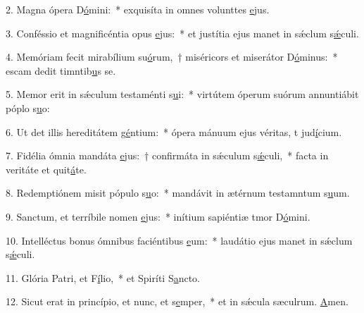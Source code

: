 2. Magna ópera D\uline{ó}mini:~* exquisíta in omnes volunttes \uline{e}jus.\par 
3. Conféssio et magnificéntia opus \uline{e}jus:~* et justítia ejus manet in sǽclum s\uline{ǽ}culi.\par 
4. Memóriam fecit mirabílium su\uline{ó}rum,~† miséricors et miserátor D\uline{ó}minus:~* escam dedit timntib\uline{u}s se.\par 
5. Memor erit in sǽculum testaménti s\uline{u}i:~* virtútem óperum suórum annuntiábit póplo s\uline{u}o:\par 
6. Ut det illis hereditátem g\uline{é}ntium:~* ópera mánuum ejus véritas, t jud\uline{í}cium.\par 
7. Fidélia ómnia mandáta \uline{e}jus:~† confirmáta in sǽculum s\uline{ǽ}culi,~* facta in veritáte et quit\uline{á}te.\par 
8. Redemptiónem misit pópulo s\uline{u}o:~* mandávit in ætérnum testamntum s\uline{u}um.\par 
9. Sanctum, et terríbile nomen \uline{e}jus:~* inítium sapiéntiæ tmor D\uline{ó}mini.\par 
10. Intelléctus bonus ómnibus faciéntibus \uline{e}um:~* laudátio ejus manet in sǽclum s\uline{ǽ}culi.\par 
11. Glória Patri, et F\uline{í}lio,~* et Spiríti S\uline{a}ncto.\par 
12. Sicut erat in princípio, et nunc, et s\uline{e}mper,~* et in sǽcula sæculrum. \uline{A}men.\par 
